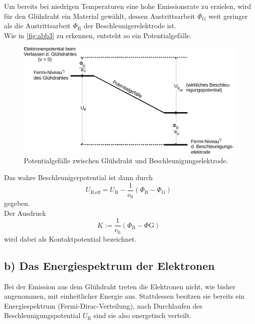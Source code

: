 Um bereits bei niedrigen Temperaturen eine hohe Emissionsrate zu erzielen, wird für den Glühdraht ein Material
gewählt, dessen Austrittsarbeit $\Phi_\text{G}$ weit geringer als die Austrittsarbeit $\Phi_\text{B}$ der
Beschleunigerelektrode ist. \\

Wie in \autoref{fig:abb3} zu erkennen, entsteht so ein Potentialgefälle.

\begin{figure}
    \centering
    \includegraphics{figures/Abb_3.pdf}
    \caption{Potentialgefälle zwischen Glühdraht und Beschleunigungselektrode\cite{ap08}.}
    \label{fig:abb3}
\end{figure}

Das wahre Beschleunigerpotential ist dann durch
\begin{equation}
    U_{\text{B},\text{eff}} = U_\text{B} - \frac{1}{\text{e}_0} (\Phi_\text{B} - \Phi_\text{G})
    \label{Ueff}
\end{equation}
gegeben. \\

Der Ausdruck
\begin{equation*}
    K := \frac{1}{\text{e}_0} (\Phi_\text{B} - \Phi\text{G})
\end{equation*}
wird dabei als Kontaktpotential bezeichnet.


\subsection*{b) Das Energiespektrum der Elektronen}

Bei der Emission aus dem Glühdraht treten die Elektronen nicht, wie bisher angenommen, mit einheitlicher Energie aus.
Stattdessen besitzen sie bereits ein Energiespektrum (Fermi-Dirac-Verteilung), nach Durchlaufen des Beschleunigungspotential $U_\text{B}$
sind sie also energetisch verteilt. \\

